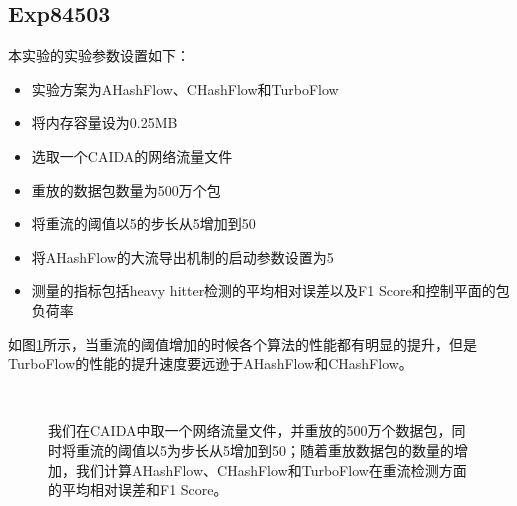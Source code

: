 \documentclass{article}
\begin{document}
\subsection{Exp84503}
本实验的实验参数设置如下：
\begin{itemize}
	\item 实验方案为AHashFlow、CHashFlow和TurboFlow
	\item 将内存容量设为0.25MB
	\item 选取一个CAIDA的网络流量文件
	\item 重放的数据包数量为500万个包
	\item 将重流的阈值以5的步长从5增加到50
	\item 将AHashFlow的大流导出机制的启动参数设置为5
	\item 测量的指标包括heavy hitter检测的平均相对误差以及F1 Score和控制平面的包负荷率
\end{itemize}

如图\ref{fig:hh_dection_various_thresholds}所示，当重流的阈值增加的时候各个算法的性能都有明显的提升，但是TurboFlow的性能的提升速度要远逊于AHashFlow和CHashFlow。
\begin{figure}[ht!]
	\centering
	\mbox{
	}
	\caption{我们在CAIDA中取一个网络流量文件，并重放的500万个数据包，同时将重流的阈值以5为步长从5增加到50；随着重放数据包的数量的增加，我们计算AHashFlow、CHashFlow和TurboFlow在重流检测方面的平均相对误差和F1 Score。}
	\label{fig:hh_dection_various_thresholds}
\end{figure}
\end{document}
